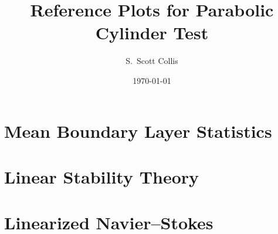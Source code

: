 \documentclass[12pt, oneside]{amsart}
\title{Reference Plots for Parabolic Cylinder Test}
\author{S.\ Scott Collis}
\date{\today}
\begin{document}
\maketitle

\section{Mean Boundary Layer Statistics}

\begin{figure}[!htb]
\centering

\end{figure}

\begin{figure}[!htb]
\centering

\end{figure}

\begin{figure}[!htb]
\centering

\end{figure}

\begin{figure}[!htb]
\centering

\end{figure}

\begin{figure}[!htb]
\centering

\end{figure}

\begin{figure}[!htb]
\centering

\end{figure}

\begin{figure}[!htb]
\centering

\end{figure}

\section{Linear Stability Theory}

\begin{figure}[!htb]
\centering

\end{figure}

\begin{figure}[!htb]
\centering

\end{figure}

\begin{figure}[!htb]
\centering

\end{figure}

\begin{figure}[!htb]
\centering

\end{figure}

\section{Linearized Navier--Stokes}
\end{document}
